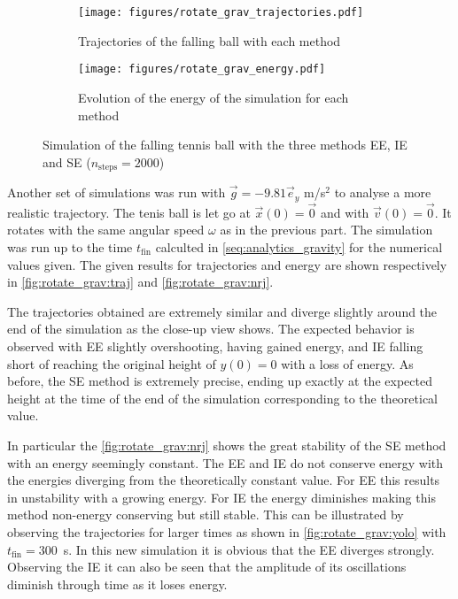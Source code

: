 \begin{figure}[h]
    \centering
    \begin{subfigure}{0.49\linewidth}
        \centering
        \texttt{[image: figures/rotate\_grav\_trajectories.pdf]}
        \caption{Trajectories of the falling ball with each method}
        \label{fig:rotate_grav:traj}
    \end{subfigure}
    \hspace*{0.2cm}
    \begin{subfigure}{0.47\linewidth}
        \centering
        \texttt{[image: figures/rotate\_grav\_energy.pdf]}
        \caption{Evolution of the energy of the simulation for each method}
        \label{fig:rotate_grav:nrj}
    \end{subfigure}
    \caption{Simulation of the falling tennis ball with the three methods EE, IE and SE \mbox{($n_\textrm{steps}=2000$)}}
\end{figure}

Another set of simulations was run with $\vec{g} = -9.81 \vec{e}_y$ m/s$^2$ to analyse a more realistic trajectory. The tenis ball is let go at $\vec{x}(0) = \vec{0}$ and with $\vec{v}(0) = \vec{0}$. It rotates with the same angular speed $\omega$ as in the previous part. The simulation was run up to the time $t_\mathrm{fin}$ calculted in \ref{seq:analytics_gravity} for the numerical values given. The given results for trajectories and energy are shown respectively in \autoref{fig:rotate_grav:traj} and \autoref{fig:rotate_grav:nrj}.

The trajectories obtained are extremely similar and diverge slightly around the end of the simulation as the close-up view shows. The expected behavior is observed with EE slightly overshooting, having gained energy, and IE falling short of reaching the original height of $y(0) = 0$ with a loss of energy. As before, the SE method is extremely precise, ending up exactly at the expected height at the time of the end of the simulation corresponding to the theoretical value.

In particular the \autoref{fig:rotate_grav:nrj} shows the great stability of the SE method with an energy seemingly constant. The EE and IE do not conserve energy with the energies diverging from the theoretically constant value. For EE this results in unstability with a growing energy. For IE the energy diminishes making this method non-energy conserving but still stable. This can be illustrated by observing the trajectories for larger times as shown in \autoref{fig:rotate_grav:yolo} with \mbox{$t_\mathrm{fin} = 300$ s}. In this new simulation it is obvious that the EE diverges strongly. Observing the IE it can also be seen that the amplitude of its oscillations diminish through time as it loses energy.

